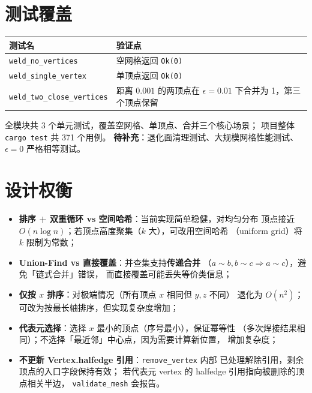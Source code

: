 \documentclass[11pt,a4paper]{article}
\begin{document}
\section{测试覆盖}

\begin{center}
\renewcommand{\arraystretch}{1.18}
\begin{tabular}{@{}ll@{}}
  \toprule
  \textbf{测试名} & \textbf{验证点} \\
  \midrule
  \texttt{weld\_no\_vertices}        & 空网格返回 \texttt{Ok(0)} \\
  \texttt{weld\_single\_vertex}      & 单顶点返回 \texttt{Ok(0)} \\
  \texttt{weld\_two\_close\_vertices} & 距离 $0.001$ 的两顶点在 $\epsilon = 0.01$ 下合并为 1，第三个顶点保留 \\
  \bottomrule
\end{tabular}
\end{center}

全模块共 3 个单元测试，覆盖空网格、单顶点、合并三个核心场景；
项目整体 \texttt{cargo test} 共 371 个用例。
\textbf{待补充}：退化面清理测试、大规模网格性能测试、$\epsilon = 0$ 严格相等测试。

\section{设计权衡}

\begin{itemize}
  \item \textbf{排序 + 双重循环 vs 空间哈希}：当前实现简单稳健，对均匀分布
        顶点接近 $O(n \log n)$；若顶点高度聚集（$k$ 大），可改用空间哈希
        （uniform grid）将 $k$ 限制为常数；
  \item \textbf{Union-Find vs 直接覆盖}：并查集支持\textbf{传递合并}
        （$a \sim b, b \sim c \Rightarrow a \sim c$），避免「链式合并」错误，
        而直接覆盖可能丢失等价类信息；
  \item \textbf{仅按 $x$ 排序}：对极端情况（所有顶点 $x$ 相同但 $y, z$ 不同）
        退化为 $O(n^2)$；可改为按最长轴排序，但实现复杂度增加；
  \item \textbf{代表元选择}：选择 $x$ 最小的顶点（序号最小），保证幂等性
        （多次焊接结果相同）；不选择「最近邻」中心点，因为需要计算新位置，
        增加复杂度；
  \item \textbf{不更新 Vertex.halfedge 引用}：\texttt{remove\_vertex} 内部
        已处理解除引用，剩余顶点的入口字段保持有效；
        若代表元 vertex 的 halfedge 引用指向被删除的顶点相关半边，
        \texttt{validate\_mesh} 会报告。
\end{itemize}
\end{document}
